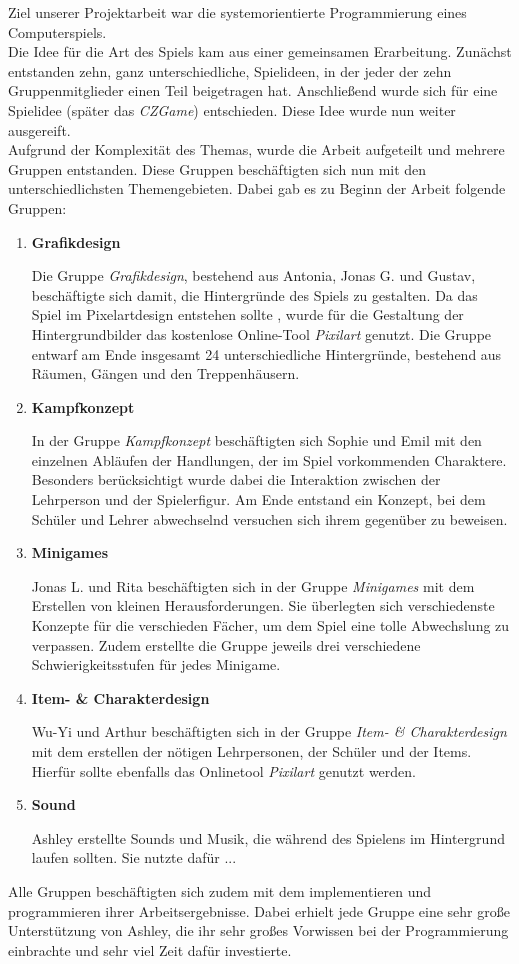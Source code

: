 	Ziel unserer Projektarbeit war die systemorientierte Programmierung eines Computerspiels. \\
    Die Idee für die Art des Spiels kam aus einer gemeinsamen Erarbeitung. Zunächst entstanden zehn, ganz unterschiedliche, Spielideen, in der jeder der zehn Gruppenmitglieder einen Teil beigetragen hat. Anschließend wurde sich für eine Spielidee (später das \emph{CZGame}) entschieden. Diese Idee wurde nun weiter ausgereift. \\ 
	Aufgrund der Komplexität des Themas, wurde die Arbeit aufgeteilt und mehrere Gruppen entstanden. Diese Gruppen beschäftigten sich nun mit den unterschiedlichsten Themengebieten. Dabei gab es zu Beginn der Arbeit folgende Gruppen:
	\begin{enumerate}
		
		\item \textbf{Grafikdesign}
        
            Die Gruppe \emph{Grafikdesign}, bestehend aus Antonia, Jonas G. und Gustav, beschäftigte sich damit, die Hintergründe des Spiels zu gestalten. Da das Spiel im Pixelartdesign entstehen sollte , wurde für die Gestaltung der Hintergrundbilder das kostenlose Online-Tool \emph{Pixilart}  genutzt. Die Gruppe entwarf am Ende insgesamt 24 unterschiedliche Hintergründe, bestehend aus Räumen, Gängen und den Treppenhäusern.
	
		\item \textbf{Kampfkonzept}

            In der Gruppe \emph{Kampfkonzept} beschäftigten sich Sophie und Emil mit den einzelnen Abläufen der Handlungen, der im Spiel vorkommenden Charaktere. Besonders berücksichtigt wurde dabei die Interaktion zwischen der Lehrperson und der Spielerfigur. Am Ende entstand ein Konzept, bei dem Schüler und Lehrer abwechselnd versuchen sich ihrem gegenüber zu beweisen.
	
		\item \textbf{Minigames}
        
            Jonas L. und Rita beschäftigten sich in der Gruppe \emph{Minigames} mit dem Erstellen von kleinen Herausforderungen. Sie überlegten sich verschiedenste Konzepte für die verschieden Fächer, um dem Spiel eine tolle Abwechslung zu verpassen. Zudem erstellte die Gruppe jeweils drei verschiedene Schwierigkeitsstufen für jedes Minigame.  
	
		\item \textbf{Item- \& Charakterdesign}

            Wu-Yi und Arthur beschäftigten sich in der Gruppe \emph{Item- \& Charakterdesign} mit dem erstellen der nötigen Lehrpersonen, der Schüler und der Items. Hierfür sollte ebenfalls das Onlinetool \emph{Pixilart} genutzt werden.
	
		\item \textbf{Sound}

            Ashley erstellte Sounds und Musik, die während des Spielens im Hintergrund laufen sollten. Sie nutzte dafür ...
	
	\end{enumerate}

    Alle Gruppen beschäftigten sich zudem mit dem implementieren und programmieren ihrer Arbeitsergebnisse. Dabei erhielt jede Gruppe eine sehr große Unterstützung von Ashley, die ihr sehr großes Vorwissen bei der Programmierung einbrachte und sehr viel Zeit dafür investierte.
	
	 